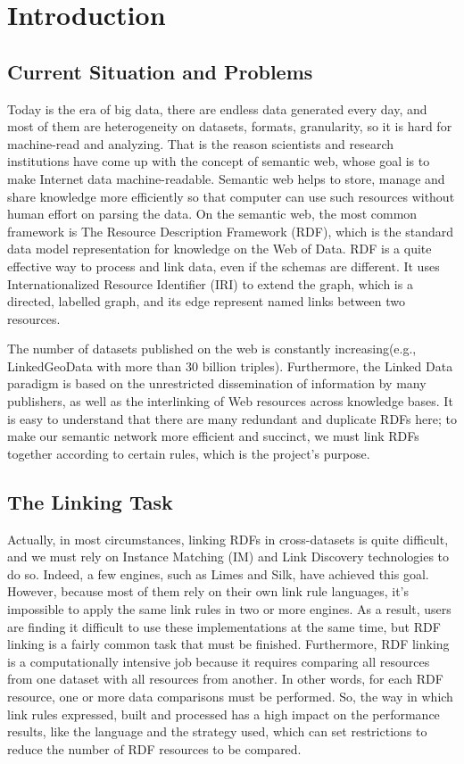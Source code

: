 \chapter{Introduction}

\section{Current Situation and Problems}

Today is the era of big data, there are endless data generated every day, and most of them are heterogeneity on datasets, formats, granularity, so it is hard for machine-read and analyzing. That is the reason scientists and research institutions have come up with the concept of semantic web, whose goal is to make Internet data machine-readable. Semantic web helps to store, manage and share knowledge more efficiently so that computer can use such resources without human effort on parsing the data. On the semantic web, the most common framework is The Resource Description Framework (RDF), which is the standard data model representation for knowledge on the Web of Data. RDF is a quite effective way to process and link data, even if the schemas are different. It uses Internationalized Resource Identifier (IRI) to extend the graph, which is a directed, labelled graph, and its edge represent named links between two resources. 

The number of datasets published on the web is constantly increasing(e.g., LinkedGeoData with more than 30 billion triples). Furthermore, the Linked Data paradigm is based on the unrestricted dissemination of information by many publishers, as well as the interlinking of Web resources across knowledge bases. It is easy to understand that there are many redundant and duplicate RDFs here; to make our semantic network more efficient and succinct, we must link RDFs together according to certain rules, which is the project's purpose.



\section{The Linking Task}

Actually, in most circumstances, linking RDFs in cross-datasets is quite difficult, and we must rely on Instance Matching (IM) and Link Discovery technologies to do so. Indeed, a few engines, such as Limes and Silk, have achieved this goal. However, because most of them rely on their own link rule languages, it's impossible to apply the same link rules in two or more engines. As a result, users are finding it difficult to use these implementations at the same time, but RDF linking is a fairly common task that must be finished. Furthermore, RDF linking is a computationally intensive job because it requires comparing all resources from one dataset with all resources from another. In other words, for each RDF resource, one or more data comparisons must be performed. So, the way in which link rules expressed, built and processed has a high impact on the performance results, like the language and the strategy used, which can set restrictions to reduce the number of RDF resources to be compared.

